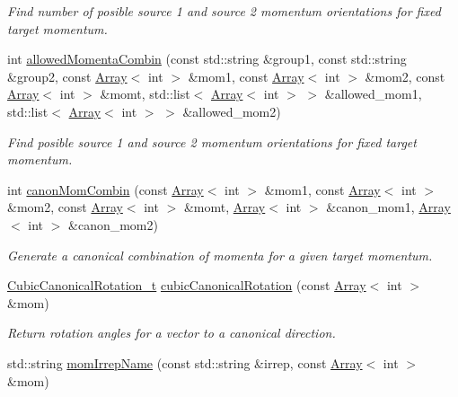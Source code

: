 \begin{DoxyCompactItemize}
\begin{DoxyCompactList}\small\item\em Find number of posible source 1 and source 2 momentum orientations for fixed target momentum. \end{DoxyCompactList}\item 
int \mbox{\hyperlink{namespaceHadron_a9aa2554e3522f9947be804d36603b887}{allowed\+Momenta\+Combin}} (const std\+::string \&group1, const std\+::string \&group2, const \mbox{\hyperlink{classXMLArray_1_1Array}{Array}}$<$ int $>$ \&mom1, const \mbox{\hyperlink{classXMLArray_1_1Array}{Array}}$<$ int $>$ \&mom2, const \mbox{\hyperlink{classXMLArray_1_1Array}{Array}}$<$ int $>$ \&momt, std\+::list$<$ \mbox{\hyperlink{classXMLArray_1_1Array}{Array}}$<$ int $>$ $>$ \&allowed\+\_\+mom1, std\+::list$<$ \mbox{\hyperlink{classXMLArray_1_1Array}{Array}}$<$ int $>$ $>$ \&allowed\+\_\+mom2)
\begin{DoxyCompactList}\small\item\em Find posible source 1 and source 2 momentum orientations for fixed target momentum. \end{DoxyCompactList}\item 
int \mbox{\hyperlink{namespaceHadron_ab874ef7e96f2c243de41a6ef639bf3c3}{canon\+Mom\+Combin}} (const \mbox{\hyperlink{classXMLArray_1_1Array}{Array}}$<$ int $>$ \&mom1, const \mbox{\hyperlink{classXMLArray_1_1Array}{Array}}$<$ int $>$ \&mom2, const \mbox{\hyperlink{classXMLArray_1_1Array}{Array}}$<$ int $>$ \&momt, \mbox{\hyperlink{classXMLArray_1_1Array}{Array}}$<$ int $>$ \&canon\+\_\+mom1, \mbox{\hyperlink{classXMLArray_1_1Array}{Array}}$<$ int $>$ \&canon\+\_\+mom2)
\begin{DoxyCompactList}\small\item\em Generate a canonical combination of momenta for a given target momentum. \end{DoxyCompactList}\item 
\mbox{\hyperlink{structHadron_1_1CubicCanonicalRotation__t}{Cubic\+Canonical\+Rotation\+\_\+t}} \mbox{\hyperlink{namespaceHadron_ada689173e1553ad2f452af24028eae2f}{cubic\+Canonical\+Rotation}} (const \mbox{\hyperlink{classXMLArray_1_1Array}{Array}}$<$ int $>$ \&mom)
\begin{DoxyCompactList}\small\item\em Return rotation angles for a vector to a canonical direction. \end{DoxyCompactList}\item 
std\+::string \mbox{\hyperlink{namespaceHadron_a5c4cac841f1c5a1f144e6c98360d8a4d}{mom\+Irrep\+Name}} (const std\+::string \&irrep, const \mbox{\hyperlink{classXMLArray_1_1Array}{Array}}$<$ int $>$ \&mom)

\end{DoxyCompactItemize}
